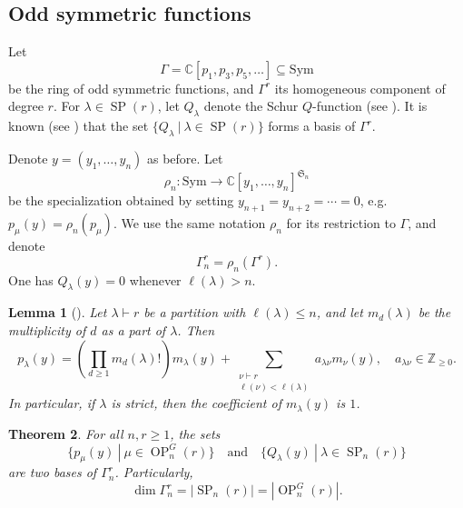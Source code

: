 \documentclass[11pt]{amsart}
\numberwithin{equation}{section}
\theoremstyle{plain}
\newtheorem{thm}{Theorem}[section]
\newtheorem{lem}[thm]{Lemma}
\theoremstyle{definition}
\theoremstyle{remark}
\begin{document}
\subsection{Odd symmetric functions}
Let
$$\Gamma=\mathbb C[p_1,p_3,p_5,\ldots]\subseteq\mathrm{Sym}$$ be the ring of odd symmetric functions, 
and $\Gamma^r$ its homogeneous component of degree $r$.
For $\lambda\in\operatorname{SP}(r)$, let $Q_\lambda$ denote the
Schur $Q$-function (see
\cite[Chapter~III, \S8]{Mac95}). It is known (see
\cite[Chapter~III, (8.9)]{Mac95}) that the set
$
\{Q_\lambda~|~\lambda\in\operatorname{SP}(r)\}
$
forms a basis of $\Gamma^r$.

Denote $y=(y_1,\ldots,y_n)$ as before.
Let
$$
\rho_n:\mathrm{Sym}\rightarrow
\mathbb C[y_1,\ldots,y_n]^{\mathfrak S_n}
$$
be the specialization obtained by setting
$y_{n+1}=y_{n+2}=\cdots=0$, e.g. $p_\mu(y)=\rho_n(p_\mu)$.
%
We use the same notation $\rho_n$ for its
restriction to $\Gamma$, and denote
$$
\Gamma_n^r=\rho_n(\Gamma^r).
$$
One has $Q_\lambda(y)=0$ whenever $\ell(\lambda)>n$.

\begin{lem}[{\cite[Chapter~I, \S6]{Mac95}}]\label{lem:q-length-tri}
Let $\lambda\vdash r$ be a partition with $\ell(\lambda)\leq n$, and let
$m_d(\lambda)$ be the multiplicity of $d$ as a part of $\lambda$.
Then
$$
p_\lambda(y)
=
\left(\prod_{d\geq1}m_d(\lambda)!\right)m_\lambda(y)
+
\sum_{\substack{\nu\vdash r\\
                  \ell(\nu)<\ell(\lambda)}}
a_{\lambda\nu}m_\nu(y),
\quad
a_{\lambda\nu}\in\mathbb Z_{\geq0}.
$$
In particular, if $\lambda$ is strict, then the coefficient of
$m_\lambda(y)$ is $1$.
\end{lem}

\begin{thm}\label{thm:q-p-basis}
For all $n,r\geq 1$, the sets
\begin{equation*}
\{p_\mu(y)~|~\mu\in\operatorname{OP}_n^G(r)\}\quad \text{and}\quad
\{Q_\lambda(y)~|~\lambda\in\operatorname{SP}_n(r)\}
\end{equation*}
are two bases of $\Gamma_n^r$. Particularly, \begin{equation}\label{eq:Q-dim}
\dim\Gamma_n^r=|\operatorname{SP}_{n}(r)|=|\operatorname{OP}_n^G(r)|.
\end{equation} 
\end{thm}
\end{document}
